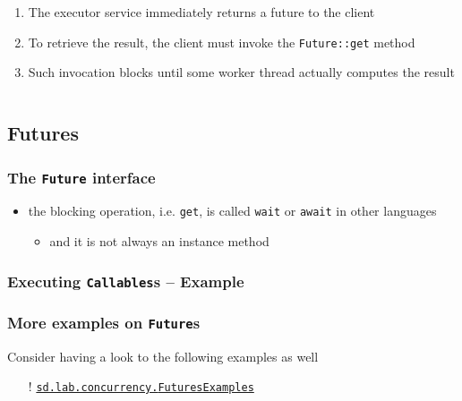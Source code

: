 \documentclass{beamer}\mode<presentation>{\usetheme{AMSCesenaPurpleAndGold}}
\begin{document}
\begin{frame}[allowframebreaks]
\begin{columns}
\begin{column}{.4\linewidth}
\begin{enumerate}
\item The executor service \alert{immediately} returns a future to the client

\item To retrieve the result, the client must invoke the \alert{\texttt{Future::get}} method

\item Such invocation \alert{blocks} until some worker thread actually computes the result

\end{enumerate}
\end{column}
\end{columns}

\end{frame}

\subsection{Futures}

\begin{frame}%
\frametitle{The \texttt{Future} interface}



\begin{itemize}
	\item the blocking operation, i.e. \texttt{get}, is called \texttt{wait} or \texttt{\alert{await}} in other languages
	\begin{itemize}
		\item and it is not always an instance method
	\end{itemize}
\end{itemize}

\end{frame}

\begin{frame}%
\frametitle{Executing \texttt{Callables}s -- Example}



\end{frame}

\begin{frame}[c]
\frametitle{More examples on \texttt{Future}s}

Consider having a look to the following examples as well
%
\begin{itemize}
	\item[!] \href{https://gitlab.com/pika-lab/courses/ds/aa1920/lab-03/blob/master/src/test/java/sd/lab/concurrency/FuturesExamples.java}{\texttt{sd.lab.concurrency.\alert{FuturesExamples}}}
\end{itemize}

\end{frame}
\end{document}

